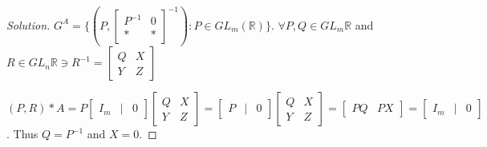 \documentclass{article}
\newcommand{\R}{\mathbb{R}}
\newenvironment{solution}
{\renewcommand\qedsymbol{$\blacksquare$}\begin{proof}[Solution]}
{\end{proof}}
\begin{document}
\begin{solution}
    $G^A = \{(P, \begin{bmatrix}
        P^{-1} & 0\\
        * & *
    \end{bmatrix}^{-1}) : P \in GL_m(\R)\}$. $\forall P, Q \in GL_m{\R}$ and $R \in GL_n{\R} \ni R^{-1} = \begin{bmatrix}
        Q & X \\
        Y & Z
    \end{bmatrix}$

    $(P, R) \ast A = P \begin{bmatrix}
        I_m & \vert & 0
    \end{bmatrix} \begin{bmatrix}
        Q & X \\
        Y & Z
    \end{bmatrix} = \begin{bmatrix}
        P & \vert & 0
    \end{bmatrix}\begin{bmatrix}
        Q & X \\
        Y & Z
    \end{bmatrix} = \begin{bmatrix}
        PQ & PX
    \end{bmatrix} = \begin{bmatrix}
        I_m & \vert & 0
    \end{bmatrix}$. Thus $Q = P^{-1}$ and $X = 0$.
\end{solution}

\bigskip
\end{document}
